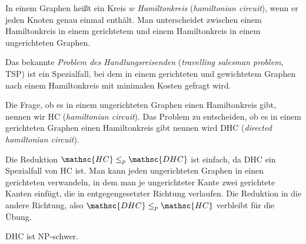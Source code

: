 \begin{Def}
  \hspace{\parindent}In einem Graphen heißt ein Kreis $w$ \textit{Hamiltonkreis} (\textit{hamiltonian circuit}), wenn er jeden Knoten genau einmal enthält. Man unterscheidet zwischen einem Hamiltonkreis in einem gerichtetem und einem Hamiltonkreis in einem ungerichteten Graphen.
\end{Def}

Das bekannte \textit{Problem des Handlungsreisenden} (\textit{travelling salesman problem}, \textsc{TSP}) ist ein Spezialfall, bei dem in einem gerichteten und gewichtetem Graphen nach einem Hamiltonkreis mit minimalen Kosten gefragt wird.

Die Frage, ob es in einem ungerichteten Graphen einen Hamiltonkreis gibt, nennen wir \textsc{HC} (\textit{hamiltonian circuit}). Das Problem zu entscheiden, ob es in einem gerichteten Graphen einen Hamiltonkreis gibt nennen wird \textsc{DHC} (\textit{directed hamiltonian circuit}).

Die Reduktion $\mathsc{HC} \le_p \mathsc{DHC}$ ist einfach, da \textsc{DHC} ein Spezialfall von \textsc{HC} ist. Man kann jeden ungerichteten Graphen in einen gerichteten verwandeln, in dem man je ungerichteter Kante zwei gerichtete Kanten einfügt, die in entgegengesetzter Richtung verlaufen. Die Reduktion in die andere Richtung, also $\mathsc{DHC} \le_p \mathsc{HC}$ verbleibt für die Übung.

\begin{Satz}
  \hspace{\parindent}\textsc{DHC} ist \textsf{NP}-schwer.
\end{Satz}

